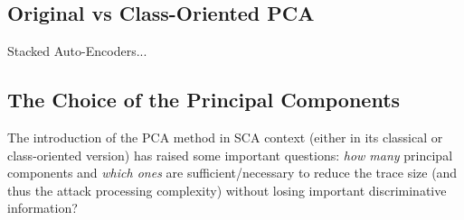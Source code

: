 \subsection{Original vs Class-Oriented PCA}
\begin{remark}
Stacked Auto-Encoders...
\end{remark}
\subsection{The Choice of the Principal Components}\label{sec:ELV}
The introduction of the PCA method in SCA context (either in its classical or class-oriented version)  has raised some important questions: \textit{how many} principal components and \textit{which ones} are sufficient/necessary to reduce the trace size (and thus the attack processing complexity) without losing important discriminative information?\\

